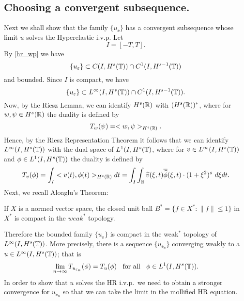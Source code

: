 \subsection{Choosing  a convergent subsequence.}
%
Next we shall show that  the family $\{ u_\ee\}$ has a convergent subsequence
whose limit $u$ solves the Hyperelastic i.v.p. 
Let
$$
I= [-T, T].
$$
By \cref{hr_wp} we have 
%
\begin{equation}
\label{C-1-fam}
\{u_\varepsilon\}\subset C(I, H^s(\mathbb{T}))\cap C^1(I, H^{s-1}(\mathbb{T}))
\end{equation}
%
and bounded. Since $I$ is compact, we have  
%
\begin{equation}
\label{Lip-1-fam}
\{u_\varepsilon\}\subset L^{\infty}(I, H^s(\mathbb{T}))\cap C^1(I,
H^{s-1}(\mathbb{T})).
\end{equation}
%
Now, by the Riesz Lemma, we can identify $H^s(\mathbb{R})$ with
$(H^s(\mathbb{R}))^*$, where for $w, \psi \in H^s(\mathbb{R})$ the duality is
defined by 
\begin{equation*}
T_w(\psi) = <w, \psi>_{H^s(\mathbb{R})}.
\end{equation*}
Hence, by the Riesz Representation Theorem it follows that we can
identify \\ $L^\infty(I, H^s(\mathbb{T})) $ with the dual space of $L^1(I,
H^{s}(\mathbb{T})$, where for $v\in L^\infty(I, H^s(\mathbb{T})) $ and $ \phi \in
L^1(I, H^{s}(\mathbb{T}))$ the duality is defined by  
%
\begin{equation}
T_v(\phi) = \int_I <v (t), \phi (t)>_{H^s(\mathbb{R})} dt  = \int_I
\int_{\mathbb{R}}
\widehat{v}(\xi, t) \overline{\widehat{\phi}}(\xi, t) \cdot (1
+ \xi^2)^s \ d \xi dt.
\end{equation}
%
Next, we recall Aloaglu's Theorem:
\begin{theorem}
If $X$ is a normed vector space,
the closed unit ball $B^* = \{f \in X^* : \|f\| \le
1\}$ in $X^*$ is compact in the $weak^*$ topology.
\end{theorem}
Therefore the bounded family $\{u_\ee\}$ is compact 
in the weak$^*$ topology of \\
$L^\infty(I, H^s(\mathbb{T}))$. More precisely,
there is a sequence  $\{ u_{\ee_n} \}$ converging
weakly to a $ u\in L^{\infty}(I, H^s(\mathbb{T}))$;
that is 
%
\begin{equation}
\label{weak-conv}
\lim_{n\to \infty} T_{u_{\varepsilon_n}}(\phi)  =  T_u (\phi) 
\; \; \ 		
\text{for all} \ \;\;  \phi \in L^1(I, H^{s}(\mathbb{T})).
\end{equation}
%
In order to show that  $u$ solves the HR i.v.p.\ we need to 
obtain a stronger  convergence for  $u_{\ee_n}$ so that 
we can take the limit in the mollified HR equation.
